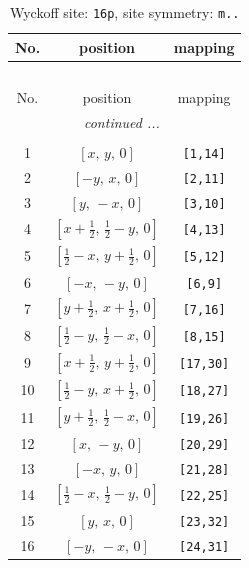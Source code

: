 \documentclass[fleqn,8pt]{jsarticle}
\begin{document}
\begin{longtable}{ccc}
\caption{Wyckoff site: {\tt 16p}, site symmetry: {\tt m..}}
 \\
 \hline \hline
No. & position & mapping \\ \hline \endfirsthead

\multicolumn{2}{l}{\tablename\ \thetable{}} \\
 \hline \hline
No. & position & mapping \\ \hline \endhead

 \hline \hline
\multicolumn{2}{r}{\footnotesize\it continued ...} \\ \endfoot

 \hline \hline
\multicolumn{2}{r}{} \\ \endlastfoot

1 & $\left[ x,\, y,\, 0 \right]$ & {\tt [1,14]} \\ \hline
2 & $\left[ - y,\, x,\, 0 \right]$ & {\tt [2,11]} \\ \hline
3 & $\left[ y,\, - x,\, 0 \right]$ & {\tt [3,10]} \\ \hline
4 & $\left[ x + \frac{1}{2},\, \frac{1}{2} - y,\, 0 \right]$ & {\tt [4,13]} \\ \hline
5 & $\left[ \frac{1}{2} - x,\, y + \frac{1}{2},\, 0 \right]$ & {\tt [5,12]} \\ \hline
6 & $\left[ - x,\, - y,\, 0 \right]$ & {\tt [6,9]} \\ \hline
7 & $\left[ y + \frac{1}{2},\, x + \frac{1}{2},\, 0 \right]$ & {\tt [7,16]} \\ \hline
8 & $\left[ \frac{1}{2} - y,\, \frac{1}{2} - x,\, 0 \right]$ & {\tt [8,15]} \\ \hline
9 & $\left[ x + \frac{1}{2},\, y + \frac{1}{2},\, 0 \right]$ & {\tt [17,30]} \\ \hline
10 & $\left[ \frac{1}{2} - y,\, x + \frac{1}{2},\, 0 \right]$ & {\tt [18,27]} \\ \hline
11 & $\left[ y + \frac{1}{2},\, \frac{1}{2} - x,\, 0 \right]$ & {\tt [19,26]} \\ \hline
12 & $\left[ x,\, - y,\, 0 \right]$ & {\tt [20,29]} \\ \hline
13 & $\left[ - x,\, y,\, 0 \right]$ & {\tt [21,28]} \\ \hline
14 & $\left[ \frac{1}{2} - x,\, \frac{1}{2} - y,\, 0 \right]$ & {\tt [22,25]} \\ \hline
15 & $\left[ y,\, x,\, 0 \right]$ & {\tt [23,32]} \\ \hline
16 & $\left[ - y,\, - x,\, 0 \right]$ & {\tt [24,31]} \\
\end{longtable}
\end{document}
